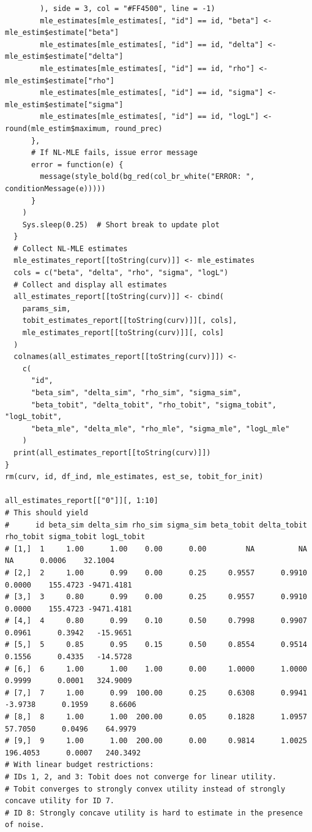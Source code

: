 \documentclass[11pt, a4paper, oneside]{article}
\theoremstyle{Plain}
\theoremstyle{Definition}
\theoremstyle{Remark}
\begin{document}
\begin{appendix}
\begin{lstlisting}
        ), side = 3, col = "#FF4500", line = -1)
        mle_estimates[mle_estimates[, "id"] == id, "beta"] <- mle_estim$estimate["beta"]
        mle_estimates[mle_estimates[, "id"] == id, "delta"] <- mle_estim$estimate["delta"]
        mle_estimates[mle_estimates[, "id"] == id, "rho"] <- mle_estim$estimate["rho"]
        mle_estimates[mle_estimates[, "id"] == id, "sigma"] <- mle_estim$estimate["sigma"]
        mle_estimates[mle_estimates[, "id"] == id, "logL"] <- round(mle_estim$maximum, round_prec)
      },
      # If NL-MLE fails, issue error message
      error = function(e) {
        message(style_bold(bg_red(col_br_white("ERROR: ", conditionMessage(e)))))
      }
    )
    Sys.sleep(0.25)  # Short break to update plot
  }
  # Collect NL-MLE estimates
  mle_estimates_report[[toString(curv)]] <- mle_estimates
  cols = c("beta", "delta", "rho", "sigma", "logL")
  # Collect and display all estimates
  all_estimates_report[[toString(curv)]] <- cbind(
    params_sim,
    tobit_estimates_report[[toString(curv)]][, cols],
    mle_estimates_report[[toString(curv)]][, cols]
  )
  colnames(all_estimates_report[[toString(curv)]]) <-
    c(
      "id",
      "beta_sim", "delta_sim", "rho_sim", "sigma_sim",
      "beta_tobit", "delta_tobit", "rho_tobit", "sigma_tobit", "logL_tobit",
      "beta_mle", "delta_mle", "rho_mle", "sigma_mle", "logL_mle"
    )
  print(all_estimates_report[[toString(curv)]])
}
rm(curv, id, df_ind, mle_estimates, est_se, tobit_for_init)

all_estimates_report[["0"]][, 1:10]
# This should yield
#      id beta_sim delta_sim rho_sim sigma_sim beta_tobit delta_tobit rho_tobit sigma_tobit logL_tobit
# [1,]  1     1.00      1.00    0.00      0.00         NA          NA        NA      0.0006    32.1004
# [2,]  2     1.00      0.99    0.00      0.25     0.9557      0.9910    0.0000    155.4723 -9471.4181
# [3,]  3     0.80      0.99    0.00      0.25     0.9557      0.9910    0.0000    155.4723 -9471.4181
# [4,]  4     0.80      0.99    0.10      0.50     0.7998      0.9907    0.0961      0.3942   -15.9651
# [5,]  5     0.85      0.95    0.15      0.50     0.8554      0.9514    0.1556      0.4335   -14.5728
# [6,]  6     1.00      1.00    1.00      0.00     1.0000      1.0000    0.9999      0.0001   324.9009
# [7,]  7     1.00      0.99  100.00      0.25     0.6308      0.9941   -3.9738      0.1959     8.6606
# [8,]  8     1.00      1.00  200.00      0.05     0.1828      1.0957   57.7050      0.0496    64.9979
# [9,]  9     1.00      1.00  200.00      0.00     0.9814      1.0025  196.4053      0.0007   240.3492
# With linear budget restrictions:
# IDs 1, 2, and 3: Tobit does not converge for linear utility.
# Tobit converges to strongly convex utility instead of strongly concave utility for ID 7.
# ID 8: Strongly concave utility is hard to estimate in the presence of noise.


\end{lstlisting}
\end{appendix}
\end{document}
